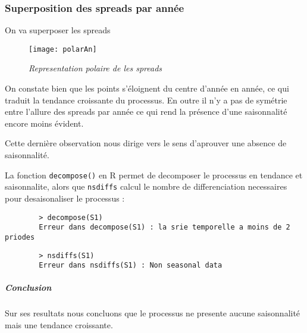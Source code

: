 

            \subsubsection{Superposition des spreads par année} 
            On va superposer les spreads
        \begin{figure}[H]
            \centering 
            \label{fig:polarAn} 
            \texttt{[image: polarAn]} 
            \caption{\it Representation polaire de les spreads } 
        \end{figure} 


        On constate bien que les points s'éloignent du centre d'année en
        année, ce qui traduit la tendance croissante du processus. En outre
        il n'y a pas de symétrie entre l'allure des spreads par année ce qui
        rend la présence d'une saisonnalité encore moins évident.

        Cette dernière observation nous dirige vers le sens d'aprouver une
        absence de saisonnalité.  

        La fonction \verb+decompose()+  en R permet de decomposer le processus en
        tendance et saisonnalite, alors que \verb+nsdiffs+ calcul le nombre de
        differenciation necessaires pour desaisonaliser le processus :
        \begin{verbatim}
        > decompose(S1)
        Erreur dans decompose(S1) : la srie temporelle a moins de 2 priodes
        \end{verbatim}

        \begin{verbatim}
        > nsdiffs(S1)
        Erreur dans nsdiffs(S1) : Non seasonal data
        \end{verbatim}


        \subparagraph{Conclusion}
        Sur ses resultats nous concluons que le processus ne presente aucune
        saisonnalité mais une tendance croissante.
           
